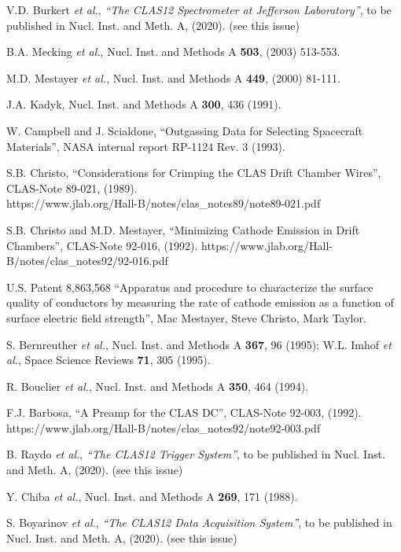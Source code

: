 \begin{thebibliography}{99}

V.D. Burkert {\it et al.}, {\it ``The CLAS12 Spectrometer at Jefferson Laboratory''}, to be published in
Nucl. Inst. and Meth. A, (2020). (see this issue)

B.A. Mecking {\it et al.}, Nucl. Inst. and Methods A {\bf 503}, (2003) 513-553.

M.D. Mestayer {\it et al.}, Nucl. Inst. and Methods A {\bf 449}, (2000) 81-111.

J.A. Kadyk, Nucl. Inst. and Methods A {\bf 300}, 436 (1991).

W. Campbell and J. Scialdone, ``Outgassing Data for Selecting Spacecraft Materials'', NASA internal
report RP-1124 Rev. 3 (1993).

S.B. Christo, ``Considerations for Crimping the CLAS Drift Chamber Wires'', CLAS-Note
89-021, (1989). \\ https://www.jlab.org/Hall-B/notes/clas\_notes89/note89-021.pdf


S.B. Christo and M.D. Mestayer, ``Minimizing Cathode Emission in Drift Chambers'', CLAS-Note 92-016,
(1992). https://www.jlab.org/Hall-B/notes/clas\_notes92/92-016.pdf

U.S. Patent 8,863,568 ``Apparatus and procedure to characterize the surface quality 
of conductors by measuring the rate of cathode emission as a function of surface electric field 
strength'', Mac Mestayer, Steve Christo, Mark Taylor.


S. Bernreuther {\it et al.}, Nucl. Inst. and Methods A {\bf 367}, 96 (1995); W.L. Imhof {\it et al.},
Space Science Reviews {\bf 71}, 305 (1995).

R. Bouclier {\it et al.}, Nucl. Inst. and Methods A {\bf 350}, 464 (1994).

F.J. Barbosa, ``A Preamp for the CLAS DC'', CLAS-Note 92-003, (1992).
https://www.jlab.org/Hall-B/notes/clas\_notes92/note92-003.pdf

B. Raydo {\it et al.}, {\it ``The CLAS12 Trigger System''}, to be published in Nucl. Inst. and Meth. A, (2020).
(see this issue)

Y. Chiba {\it et al.}, Nucl. Inst. and Methods A {\bf 269}, 171 (1988).

S. Boyarinov {\it et al.}, {\it ``The CLAS12 Data Acquisition System''}, to be published in Nucl. Inst.
and Meth. A, (2020). (see this issue)



\end{thebibliography}

